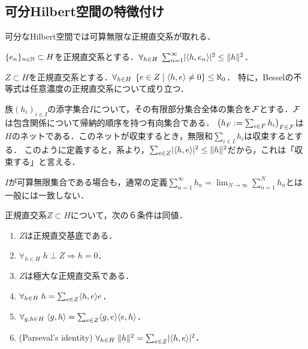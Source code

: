 \documentclass[uplatex,dvipdfmx]{jsreport}
\begin{document}
\subsection{可分Hilbert空間の特徴付け}

\begin{tcolorbox}[colframe=ForestGreen, colback=ForestGreen!10!white,breakable,colbacktitle=ForestGreen!40!white,coltitle=black,fonttitle=\bfseries\sffamily,
title=]
    可分なHilbert空間では可算無限な正規直交系が取れる．
\end{tcolorbox}

\begin{theorem}
    $\{e_n\}_{n\in\mathbb{N}}\subset H$を正規直交系とする．$\forall_{h\in H}\;\sum^\infty_{n=1}\lvert\langle h,e_n\rangle\rvert^2\le\|h\|^2$．
\end{theorem}

\begin{corollary}\label{cor-well-definedness-of-Bessel's-identity}
    $Z\subset H$を正規直交系とする．$\forall_{h\in H}\;\left\{e\in Z\mid\langle h,e\rangle\ne 0\right\}\le\aleph_0$．
    特に，Besselの不等式は任意濃度の正規直交系について成り立つ．
\end{corollary}

\begin{definition}
    族$(h_i)_{i\in I}$の添字集合$I$について，その有限部分集合全体の集合を$\mathcal{F}$とする．$\mathcal{F}$は包含関係について帰納的順序を持つ有向集合である．
    $\left(h_F:=\sum_{i\in F}h_i\right)_{F\in\mathcal{F}}$は$H$のネットである．このネットが収束するとき，無限和$\sum_{i\in I}h_i$は収束するとする．
    このように定義すると，系より，$\sum_{e\in Z}\lvert\langle h,e\rangle\rvert^2\le\|h\|^2$だから，これは「収束する」と言える．
\end{definition}
\begin{remarks}
    $I$が可算無限集合である場合も，通常の定義$\sum_{n=1}^\infty h_n=\lim_{N\to\infty}\sum_{n=1}^Nh_n$とは一般には一致しない．
\end{remarks}

\begin{theorem}[正規直交基底の特徴付け]
    正規直交系$Z\subset H$について，次の６条件は同値．
    \begin{enumerate}
        \item $Z$は正規直交基底である．
        \item $\forall_{h\in H}\;h\perp Z\Rightarrow h=0$．
        \item $Z$は極大な正規直交系である．
        \item $\forall_{h\in H}\;h=\sum_{e\in Z}\langle h,e\rangle e$．
        \item $\forall_{g,h\in H}\;\langle g,h\rangle=\sum_{e\in Z}\langle g,e\rangle\langle e,h\rangle$．
        \item (Parseval's identity) $\forall_{h\in H}\;\|h\|^2=\sum_{e\in Z}\lvert\langle h,e\rangle\rvert^2$．
    \end{enumerate}
\end{theorem}
\end{document}
